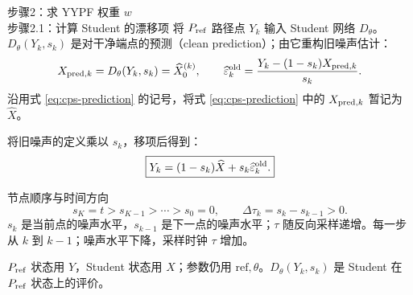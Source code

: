 \documentclass[10pt,aspectratio=169]{beamer}
\begin{document}
\begin{frame}{步骤2：求 YYPF 权重 $w$\\[-1mm]\normalsize 步骤2.1：计算 Student 的漂移项}
\footnotesize
将 \ensuremath{P_{\rm ref}} 路径点 $Y_k$ 输入 Student 网络 $D_\theta$。$D_\theta(Y_k,s_k)$ 是对干净端点的预测（clean prediction）；由它重构旧噪声估计：
\begin{equation}\label{eq:cps-prediction}
X_{{\rm pred},k}=D_\theta(Y_k,s_k)=\widehat X_0^{(k)},\qquad
\widehat\varepsilon_k^{\rm old}=
\frac{Y_k-(1-s_k)X_{{\rm pred},k}}{s_k}.
\end{equation}
沿用式 \eqref{eq:cps-prediction} 的记号，将式 \eqref{eq:cps-prediction} 中的 $X_{{\rm pred},k}$ 暂记为 $\widehat X$。\par
将旧噪声的定义乘以 $s_k$，移项后得到：
\begin{equation}\label{eq:state-decomposition}
\boxed{Y_k=(1-s_k)\widehat X+s_k\widehat\varepsilon_k^{\rm old}.}
\end{equation}
\begin{block}{节点顺序与时间方向}
\begin{equation}
s_K=t>s_{K-1}>\cdots>s_0=0,\qquad
\Delta\tau_k=s_k-s_{k-1}>0.
\end{equation}
$s_k$ 是当前点的噪声水平，$s_{k-1}$ 是下一点的噪声水平；$\tau$ 随反向采样递增。每一步从 $k$ 到 $k-1$；噪声水平下降，采样时钟 $\tau$ 增加。
\end{block}
{\small \ensuremath{P_{\rm ref}} 状态用 $Y$，Student 状态用 $X$；参数仍用 $\mathrm{ref},\theta$。$D_\theta(Y_k,s_k)$ 是 Student 在 \ensuremath{P_{\rm ref}} 状态上的评价。}
\end{frame}
\end{document}
